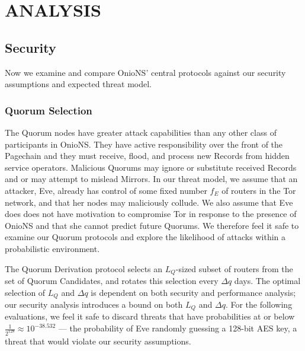 
\chapter{ANALYSIS}
\label{Chapter:Analysis}

\section{Security}

Now we examine and compare OnioNS' central protocols against our security assumptions and expected threat model. 



\subsection{Quorum Selection}

The Quorum nodes have greater attack capabilities than any other class of participants in OnioNS. They have active responsibility over the front of the Pagechain and they must receive, flood, and process new Records from hidden service operators. Malicious Quorums may ignore or substitute received Records and or may attempt to mislead Mirrors. In our threat model, we assume that an attacker, Eve, already has control of some fixed number $ f_{E} $ of routers in the Tor network, and that her nodes may maliciously collude. We also assume that Eve does does not have motivation to compromise Tor in response to the presence of OnioNS and that she cannot predict future Quorums. We therefore feel it safe to examine our Quorum protocols and explore the likelihood of attacks within a probabilistic environment.

The Quorum Derivation protocol selects an $ L_{Q} $-sized subset of routers from the set of Quorum Candidates, and rotates this selection every $ \Delta q $ days. The optimal selection of $ L_{Q} $ and $ \Delta q $ is dependent on both security and performance analysis; our security analysis introduces a bound on both $ L_{Q} $ and $ \Delta q $. For the following evaluations, we feel it safe to discard threats that have probabilities at or below $ \frac{1}{2^{128}} \approx 10^{-38.532} $ --- the probability of Eve randomly guessing a 128-bit AES key, a threat that would violate our security assumptions.


